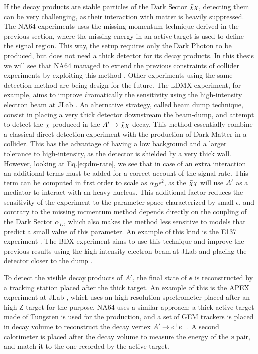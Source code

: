 If the decay products are stable particles of the Dark Sector $\bar{\chi} \chi$, detecting them can be very challenging, as their interaction with matter is heavily suppressed. The NA64 experiments uses the missing-momentum technique derived in the previous section, where the missing energy in an active target is used to define the signal region. This way, the setup requires only the Dark Photon to be produced, but does not need a thick detector for its decay products. In this thesis we will see that NA64 managed to extend the previous constraints of collider experiments by exploiting this method \cite{NA64:2019imj}. Other experiments using the same detection method are being design for the future. The LDMX experiment, for example, aims to improve dramatically the sensitivity using the high-intensity electron beam at JLab \cite{Moreno:2019tfm}. An alternative strategy, called beam dump technique, consist in placing a very thick detector downstream the beam-dump, and attempt to detect the $\chi$ produced in the $A' \to \bar{\chi} \chi$ decay. This method essentially combine a classical direct detection experiment with the production of Dark Matter in a collider. This has the advantage of having a low background and a larger tolerance to high-intensity, as the detector is shielded by a very thick wall. However, looking at Eq.\ref{eq:dm-rate}, we see that in case of an extra interaction an additional terms must be added for a correct account of the signal rate. This term can be computed in first order to scale as $\alpha_D \epsilon^2$, as the $\bar{\chi} \chi$ will use $A'$ as a mediator to interact with an heavy nucleus. This additional factor reduces the sensitivity of the experiment to the parameter space characterized by small $\epsilon$, and contrary to the missing momentum method depends directly on the coupling of the Dark Sector $\alpha_D$, which also makes the method less sensitive to models that predict a small value of this parameter. An example of this kind is the E137 experiment \cite{e137}. The BDX experiment aims to use this technique and improve the previous results using the high-intensity electron beam at JLab and placing the detector closer to the dump \cite{Battaglieri:2019nok}.

To detect the visible decay products of $A'$, the final state of $\ee$ is reconstructed by a tracking station placed after the thick target. An example of this is the APEX experiment at JLab \cite{apex}, which uses an high-resolution spectrometer placed after an high-Z target for the purpose. NA64 uses a similar approach: a thick active target made of Tungsten is used for the production, and a set of GEM trackers is placed in decay volume to reconstruct the decay vertex $A' \to e^+e^-$. A second calorimeter is placed after the decay volume to measure the energy of the $\ee$ pair, and match it to the one recorded by the active target.

